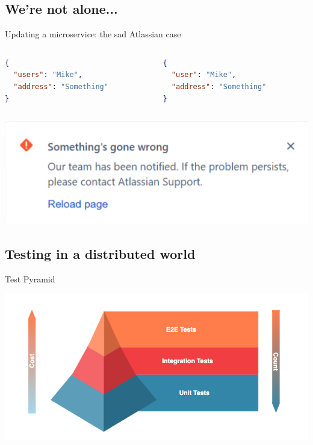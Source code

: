 \subsection{We're not alone...}
\begin{frame}[fragile]{Updating a microservice: the sad Atlassian case}
  \begin{columns}
    \begin{column}{0.5\textwidth}
      \begin{lstlisting}[language=json]
{
  "users": "Mike",
  "address": "Something"
}
      \end{lstlisting}
    \end{column}
    \begin{column}{0.5\textwidth}
        \begin{lstlisting}[language=json]
{
  "user": "Mike",
  "address": "Something"
}
        \end{lstlisting}
    \end{column}
  \end{columns}
\begin{center}
  \includegraphics[scale=.4]{./assets/atlassian}
\end{center}
\end{frame}

\subsection{Testing in a distributed world}
\begin{frame}{Test Pyramid}
  \begin{center}
    \includegraphics[scale=.6]{./assets/test_pyramid}
  \end{center}
\end{frame}

